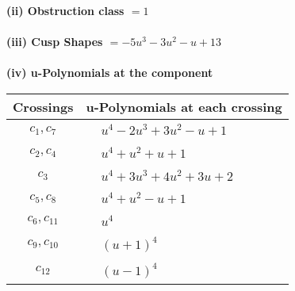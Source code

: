 \documentclass[1p]{elsarticle_modified}
\theoremstyle{definition}
\begin{document}
\flushleft \textbf{(ii) Obstruction class $= 1$}\\~\\
\flushleft \textbf{(iii) Cusp Shapes $= -5 u^3-3 u^2- u+13$}\\~\\
\newpage\renewcommand{\arraystretch}{1}
\flushleft \textbf{(iv) u-Polynomials at the component}\newline \\
\begin{tabular}{m{50pt}|m{274pt}}
Crossings & \hspace{64pt}u-Polynomials at each crossing \\
\hline $$\begin{aligned}c_{1},c_{7}\end{aligned}$$&$\begin{aligned}
&u^4-2 u^3+3 u^2- u+1
\end{aligned}$\\
\hline $$\begin{aligned}c_{2},c_{4}\end{aligned}$$&$\begin{aligned}
&u^4+u^2+u+1
\end{aligned}$\\
\hline $$\begin{aligned}c_{3}\end{aligned}$$&$\begin{aligned}
&u^4+3 u^3+4 u^2+3 u+2
\end{aligned}$\\
\hline $$\begin{aligned}c_{5},c_{8}\end{aligned}$$&$\begin{aligned}
&u^4+u^2- u+1
\end{aligned}$\\
\hline $$\begin{aligned}c_{6},c_{11}\end{aligned}$$&$\begin{aligned}
&u^4
\end{aligned}$\\
\hline $$\begin{aligned}c_{9},c_{10}\end{aligned}$$&$\begin{aligned}
&(u+1)^4
\end{aligned}$\\
\hline $$\begin{aligned}c_{12}\end{aligned}$$&$\begin{aligned}
&(u-1)^4
\end{aligned}$\\
\hline
\end{tabular}\\~\\
\end{document}
